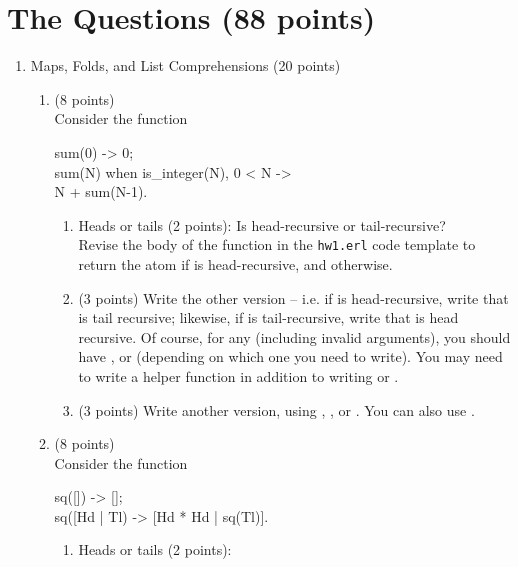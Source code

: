 \documentclass{article}
\begin{document}
\section*{The Questions (88 points)}

\begin{enumerate}
  \item Maps, Folds, and List Comprehensions (20 points)\label{q:mapfold}
    \begin{enumerate}
      \item {} (8 points)\\
	Consider the function
	\begin{xcode}
	  sum(0) -> 0;\\
	  sum(N) when is\_integer(N), 0 < N ->\\
	  \>N + sum(N-1).
	\end{xcode}
	\begin{enumerate}
	  \item Heads or tails (2 points):
	    Is  head-recursive or tail-recursive?\\
	    Revise the body of the function  in the \texttt{hw1.erl} code template to
	    return the atom  if  is head-recursive, and  otherwise.
	  \item (3 points)
	    Write the other version -- i.e. if  is head-recursive, write  that is
	    tail recursive; likewise, if  is tail-recursive, write  that is head recursive.
	    Of course, for any  (including invalid arguments), you should have
	    , or  (depending on which one you need to write).
	    You may need to write a helper function in addition to writing  or \code{sum\_tr}.
	  \item (3 points)
	    Write another version,  using , , or \listdoc{map}{2}.
	    You can also use \listdoc{seq}{2}.
	\end{enumerate}
      \item {} (8 points)\\
	Consider the function
	\begin{xcode}
	  sq([]) -> [];\\
	  sq([Hd | Tl) -> [Hd * Hd | sq(Tl)].
	\end{xcode}
	\begin{enumerate}
	  \item Heads or tails (2 points):

\end{enumerate}
\end{enumerate}
\end{enumerate}
\end{document}

